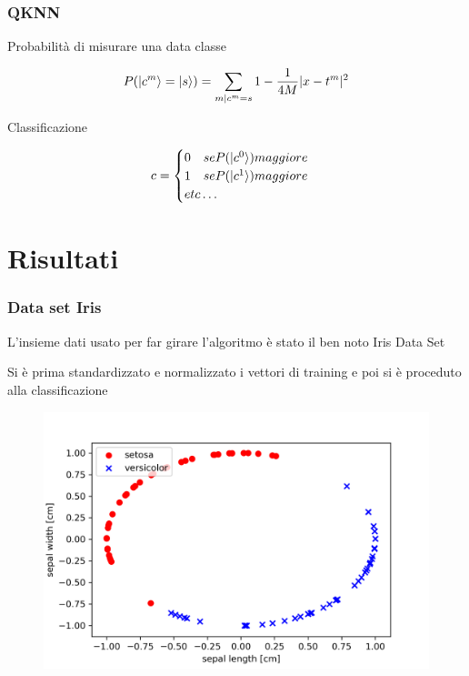 \documentclass{beamer}
\begin{document}
	\begin{frame}
		\frametitle{QKNN}
	
		Probabilità di misurare una data classe

		\begin{equation*}
			P(\ket{c^m} = \ket{s}) = \sum_{m|c^m=s} 
			1 - \frac{1}{4M} |x-t^m|^2
		\end{equation*}

		Classificazione

		\begin{equation*}
			c = \begin{cases}
			0 \quad se P(\ket{c^0}) maggiore \\
			1 \quad se P(\ket{c^1}) maggiore \\
			etc\ldots
		\end{cases}
		\end{equation*}
	
	\end{frame}

	\section{Risultati}

	\begin{frame}
		\frametitle{Data set Iris}
	
		L'insieme dati usato per far girare l'algoritmo 
		è stato il ben noto Iris Data Set

		Si è prima standardizzato e normalizzato i vettori 
		di training e poi si è proceduto alla classificazione
		
		\begin{figure}[]
			\centering
			\includegraphics[width=.75\textwidth]{gfx/iris/iris2normalized}
			\caption{}
			\label{fig:iris_normalizzato}
		\end{figure}

	\end{frame}
\end{document}
